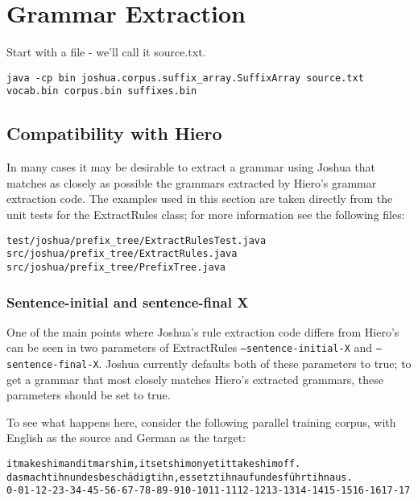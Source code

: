 \chapter{Grammar Extraction}

Start with a file - we'll call it source.txt. 

\begin{verbatim}
java -cp bin joshua.corpus.suffix_array.SuffixArray source.txt vocab.bin corpus.bin suffixes.bin
\end{verbatim}


\section{Compatibility with Hiero}

In many cases it may be desirable to extract a grammar using Joshua that matches as closely as possible the grammars extracted by Hiero's grammar extraction code. The examples used in this section are taken directly from the unit tests for the ExtractRules class; for more information see the following files:

\begin{verbatim}
test/joshua/prefix_tree/ExtractRulesTest.java
src/joshua/prefix_tree/ExtractRules.java
src/joshua/prefix_tree/PrefixTree.java
\end{verbatim}


\subsection{Sentence-initial and sentence-final X}

One of the main points where Joshua's rule extraction code differs from Hiero's can be seen in two parameters of ExtractRules {\tt --sentence-initial-X} and {\tt --sentence-final-X}. Joshua currently defaults both of these parameters to true; to get a grammar that most closely matches Hiero's extracted grammars, these parameters should be set to true.

To see what happens here, consider the following parallel training corpus, with English as the source and German as the target:

\begin{alltt}
it makes him and it mars him , it sets him on yet it takes him off .
das macht ihn und es besch\"adigt ihn , es setzt ihn auf und es f\"uhrt ihn aus .
0-0 1-1 2-2 3-3 4-4 5-5 6-6 7-7 8-8 9-9 10-10 11-11 12-12 13-13 14-14 15-15 16-16 17-17
\end{alltt}

